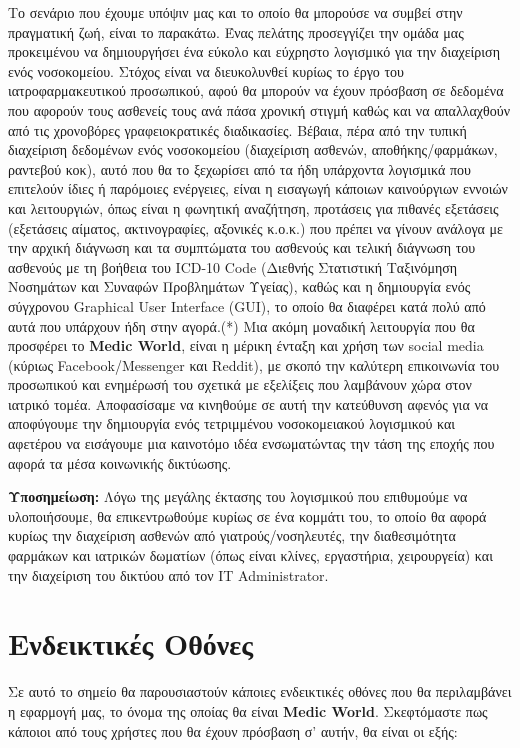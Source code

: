 \documentclass{article}
\begin{document}
Το σενάριο που έχουμε υπόψιν μας και το οποίο θα μπορούσε να συμβεί στην πραγματική ζωή, είναι το παρακάτω. Ένας πελάτης προσεγγίζει την ομάδα μας προκειμένου να δημιουργήσει ένα εύκολο και εύχρηστο λογισμικό για την διαχείριση ενός νοσοκομείου. Στόχος είναι να διευκολυνθεί κυρίως το έργο του ιατροφαρμακευτικού προσωπικού, αφού θα μπορούν να έχουν πρόσβαση σε δεδομένα που αφορούν τους ασθενείς τους ανά πάσα χρονική στιγμή καθώς και να απαλλαχθούν από τις χρονοβόρες γραφειοκρατικές διαδικασίες. Βέβαια, πέρα από την τυπική διαχείριση δεδομένων ενός νοσοκομείου (διαχείριση ασθενών, αποθήκης/φαρμάκων, ραντεβού κοκ), αυτό που θα το ξεχωρίσει από τα ήδη υπάρχοντα λογισμικά που επιτελούν ίδιες ή παρόμοιες ενέργειες, είναι η εισαγωγή κάποιων καινούργιων εννοιών και λειτουργιών, όπως είναι η φωνητική αναζήτηση, προτάσεις για πιθανές εξετάσεις (εξετάσεις αίματος, ακτινογραφίες, αξονικές κ.ο.κ.) που πρέπει να γίνουν ανάλογα με την αρχική διάγνωση και τα συμπτώματα του ασθενούς και τελική διάγνωση του ασθενούς με τη βοήθεια του ICD-10 Code (Διεθνής Στατιστική Ταξινόμηση Νοσημάτων και Συναφών Προβλημάτων Υγείας), καθώς και η δημιουργία ενός σύγχρονου Graphical User Interface (GUI), το οποίο θα διαφέρει κατά πολύ από αυτά που υπάρχουν ήδη στην αγορά.(*) Μια ακόμη μοναδική λειτουργία που θα προσφέρει το \textbf{Medic World}, είναι η μέρικη ένταξη και χρήση των social media (κύριως Facebook/Messenger και Reddit), με σκοπό την καλύτερη επικοινωνία του προσωπικού και ενημέρωσή του σχετικά με εξελίξεις που λαμβάνουν χώρα στον ιατρικό τομέα. Αποφασίσαμε να κινηθούμε σε αυτή την κατεύθυνση αφενός για να αποφύγουμε την δημιουργία ενός τετριμμένου νοσοκομειακού λογισμικού και αφετέρου να εισάγουμε μια καινοτόμο ιδέα ενσωματώντας την τάση της εποχής που αφορά τα μέσα κοινωνικής δικτύωσης.
\newline \par
\textbf{Υποσημείωση:} Λόγω της μεγάλης έκτασης του λογισμικού που επιθυμούμε να υλοποιήσουμε, θα επικεντρωθούμε κυρίως σε ένα κομμάτι του, το οποίο θα αφορά κυρίως την διαχείριση ασθενών από γιατρούς/νοσηλευτές, την διαθεσιμότητα φαρμάκων και ιατρικών δωματίων (όπως είναι κλίνες, εργαστήρια, χειρουργεία) και την διαχείριση του δικτύου από τον IT Administrator.


\section{Ενδεικτικές Οθόνες}

Σε αυτό το σημείο θα παρουσιαστούν κάποιες ενδεικτικές οθόνες που θα περιλαμβάνει η εφαρμογή μας, το όνομα της οποίας θα είναι \textbf{Medic World}. Σκεφτόμαστε πως κάποιοι από τους χρήστες που θα έχουν πρόσβαση σ' αυτήν, θα είναι οι εξής:
\end{document}
